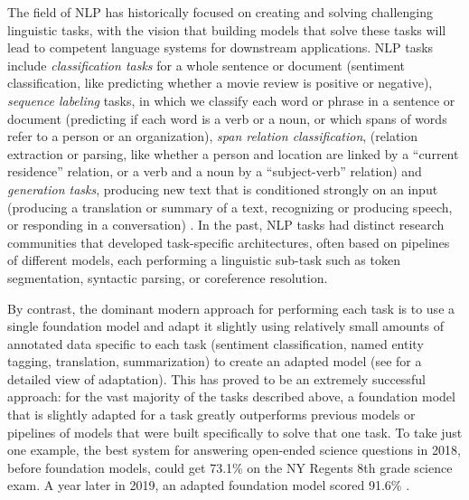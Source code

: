 The field of NLP has historically focused on creating and solving challenging linguistic tasks, with the vision that building models that solve these tasks will lead to competent language systems for downstream applications.  NLP tasks include \textit{classification tasks} for a whole sentence or document (\eg sentiment classification, like predicting  whether a movie review is positive or negative), \textit{sequence labeling} tasks, in which we classify each word or phrase in a sentence or document  (\eg predicting if each word is a verb or a noun, or which spans of words refer to a person or an organization),  \textit{span relation classification}, (\eg relation extraction or parsing, like whether  a person and location are linked by a ``current residence'' relation, or a verb and a noun by a ``subject-verb'' relation) and \textit{generation tasks}, producing new text that is conditioned strongly on an input (\eg producing a translation or summary of a text, recognizing or producing speech, or responding in a conversation) 
\citep{jurafsky2009speech}.
In the past, NLP tasks had distinct research communities that developed task-specific architectures, often based on pipelines of different models, each performing a linguistic sub-task such as token segmentation, syntactic parsing, or coreference resolution.

By contrast, the dominant modern approach for performing each task is to use a single foundation model and adapt it slightly using relatively small amounts of annotated data specific to each task (sentiment classification, named entity tagging, translation, summarization) to create an adapted model (see  for a detailed view of adaptation).
This has proved to be an extremely successful approach: for the vast majority of the tasks described above, a foundation model that is slightly adapted for a task greatly outperforms previous models or pipelines of models that were built specifically to solve that one task. To take just one example, the best system for answering open-ended science questions in 2018, before foundation models, could get 73.1\% on the NY Regents 8th grade science exam. A year later in 2019, an adapted foundation model scored 91.6\% \citep{clark2019aristo}.


